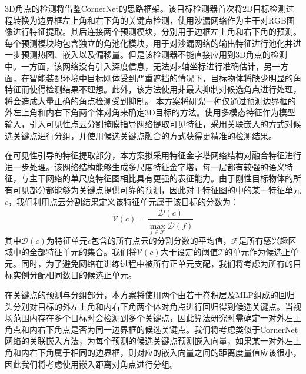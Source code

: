\documentclass[12pt]{article}
\begin{document}
3D角点的检测将借鉴CornerNet的思路框架。该目标检测器首次将2D目标检测过程转换为边界框左上角和右下角的关键点检测，使用沙漏网络作为主干对RGB图像进行特征提取。其后连接两个预测模块，分别用于边框左上角和右下角的预测。每个预测模块均包含独立的角池化模块，用于对沙漏网络的输出特征进行池化并进一步预测热图、嵌入以及偏移量。但是该检测器不能直接应用到3D角点的检测中。一方面，该网络没有引入深度信息，无法对z轴坐标进行准确估计，另一方面，在智能装配环境中目标刚体受到严重遮挡的情况下，目标物体将缺少明显的角特征而使得检测结果不理想。此外，该方法使用非最大抑制对候选角点进行处理，将会造成大量正确的角点检测受到抑制。
本方案将研究一种仅通过预测边界框的外左上角和内右下角两个体对角来确定3D目标的方法。使用多模态特征作为模型输入，引入可见性点云分割掩膜指导网络提取可见特征，采用关联嵌入的方式对候选关键点进行分组，并使用候选关键点融合的方式获得更精准的检测结果。


在可见性引导的特征提取部分，本方案拟采用特征金字塔网络结构对融合特征进行进一步处理。该网络结构能够生成多尺度特征金字塔，每一层都有较强的语义特征，与主干网络的单尺度特征图相比具有更强的表征能力。由于刚性目标物体的所有可见部分都能够为关键点提供可靠的预测，因此对于特征图的中的某一特征单元$c$，我们利用点云分割结果定义该特征单元属于该目标的分数为：
\begin{equation}
\mathcal{V}(c)=\frac{\overline{\mathcal{D}}(c)}{\max _{f \in \mathcal{F}} \overline{\mathcal{D}}(f)}
\label{eq:feature_score}
\end{equation}
其中$\overline{\mathcal{D}}(c)$为特征单元$c$包含的所有点云的分割分数的平均值，$\mathcal{F}$是所有感兴趣区域中的全部特征单元的集合。我们将$\mathcal{V}(c)$大于设定的阈值$\mathcal{T}$的单元作为候选正单元。同时，为了避免网络在训练过程中被所有正单元支配，我们将考虑为所有的目标实例分配相同数目的候选正单元。

在关键点的预测与分组部分，本方案将使用两个由若干卷积层及MLP组成的回归头分别对目标的外左上角和内右下角两个体对角点进行回归得到候选关键点。当视场范围内存在多个目标时会检测到多个关键点，因此算法研究时需确定一对外左上角点和内右下角点是否为同一边界框的候选关键点。我们将考虑类似于CornerNet网络的关联嵌入方法，为每个预测的候选关键点预测嵌入向量，如果某一对外左上角和内右下角属于相同的边界框，则对应的嵌入向量之间的距离度量值应该很小，因此我们将考虑使用嵌入距离对角点进行分组。
\end{document}
